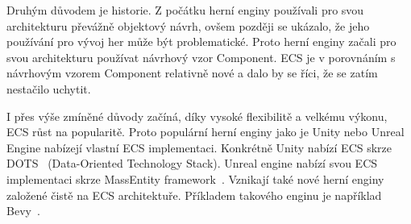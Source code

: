 Druhým důvodem je historie. Z počátku herní enginy používali pro svou architekturu převážně objektový návrh, ovšem později se ukázalo, že jeho používání pro vývoj her může být problematické. Proto herní enginy začali pro svou architekturu používat návrhový vzor Component. ECS je v porovnáním s návrhovým vzorem Component relativně nové a dalo by se říci, že se zatím nestačilo uchytit.

I přes výše zmíněné důvody začíná, díky vysoké flexibilitě a velkému výkonu, ECS růst na popularitě. Proto populární herní enginy jako je Unity nebo Unreal Engine nabízejí vlastní ECS implementaci. Konkrétně Unity nabízí ECS skrze DOTS~\cite{UnityDOTS} (Data-Oriented Technology Stack). Unreal engine nabízí svou ECS implementaci skrze MassEntity framework~\cite{UnrealMass}. Vznikají také nové herní enginy založené čistě na ECS architektuře. Příkladem takového enginu je například Bevy~\cite{Bevy}.

